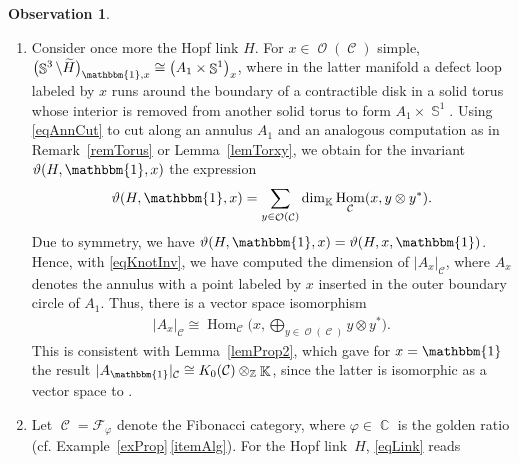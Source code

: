 \documentclass[pdftex]{sigma}
\DeclareMathOperator{\Hom}{Hom}
\DeclareMathOperator{\K}{\mathbb{K}}
\DeclareMathOperator{\C}{\mathbb{C}}
\DeclareMathOperator{\Sp}{\mathbb{S}}
\DeclareMathOperator{\calc}{\mathcal{C}}
\DeclareMathOperator{\calo}{\mathcal{O}}
\numberwithin{equation}{section}
\theoremstyle{definition}
\newtheorem{Observation}[Observation]{Observation}
\begin{document}
\begin{Observation}
\begin{enumerate}
 \begin{align}
 & \sum_{x_1, \dots, x_{|L|} \in \calo(\calc)}\prod_{j= 1}^{|L|} \dim(x_j) \, \vartheta(L, x_1, \dots, x_{|L|}) \nonumber\\
 &\qquad \overset{\rm \ref{P2}}{=} \Biggl|\Sp^3\setminus \bigsqcup_{j = 1}^{|L|}\bigl(B^3\bigr)^{\circ}\Biggr|_{\mathcal{C}} \overset{\rm \ref{P1}}{=} \dim(\calc)^{|L|-1}.\label{eqLink}
 \end{align}
 Indeed, this expression only depends on the number of components of the link. For example, for two (tame) knots $K$, $K'$, we have \[
 \sum_{x \in \calo(\calc)}\dim(x) \vartheta(K, x) = \sum_{x \in \calo(\calc)}\dim(x) \vartheta(K', x).
 \]
 \item Consider once more the Hopf link $H$. For $x \in \calo(\calc)$ simple, $\bigl(\Sp^3\setminus \widetilde{H}\bigr)_{\mathbbm{1}, x} \cong \bigl(A_1 \times \Sp^1\bigr)_x$, where in the latter manifold a defect loop labeled by $x$ runs around the boundary of a contractible disk in a solid torus whose interior is removed from another solid torus to form $A_1 \times \Sp^1$. Using \eqref{eqAnnCut} to cut along an annulus $A_1$ and an analogous computation as in Remark~\ref{remTorus} or Lemma~\ref{lemTorxy}, we obtain for the invariant $\vartheta(H, \mathbbm{1}, x)$ the expression
 \begin{align}
 \label{eqKnotInv}
 \vartheta(H, \mathbbm{1}, x) = \sum_{y \in \calo(\calc)} \dim_{\K}\Hom_{\calc}(x, y \otimes y^*).
 \end{align}
 Due to symmetry, we have $\vartheta(H, \mathbbm{1}, x) = \vartheta(H, x, \mathbbm{1})$. Hence, with \eqref{eqKnotInv}, we have computed the dimension of $|A_x|_{\calc}$, where $A_x$ denotes the annulus with a point labeled by $x$ inserted in the outer boundary circle of $A_1$. Thus, there is a vector space isomorphism
 \begin{align*}
 |A_x|_{\calc} \cong \Hom_{\calc}\biggl(x, \bigoplus_{y \in \calo(\calc)}y \otimes y^*\biggr).
 \end{align*}
 This is consistent with Lemma~\ref{lemProp2}, which gave for $x = \mathbbm{1}$ the result $|A_{\mathbbm{1}}|_{\calc} \cong K_0(\mathcal{C}) \otimes_{\mathbb{Z}} \K$, since the latter is isomorphic as a vector space to \smash{$\Hom_{\calc}\bigl(\mathbbm{1}, \bigoplus_{y \in \calo(\calc)}y \otimes y^*\bigr)$}.
 \item \label{obsEx} Let $\calc = \mathcal{F}_{\varphi}$ denote the Fibonacci category, where $\varphi \in \C$ is the golden ratio (cf. Example~\ref{exProp}\,\ref{itemAlg}). For the Hopf link~$H$, \eqref{eqLink} reads

\end{enumerate}
\end{Observation}
\end{document}

